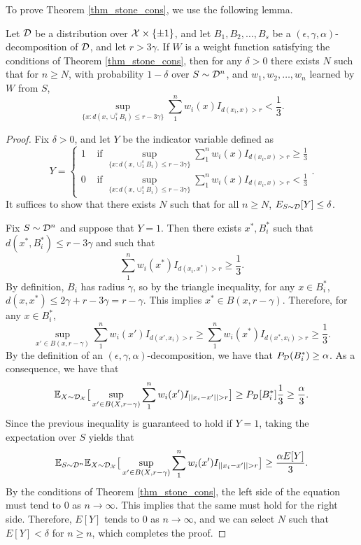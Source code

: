 To prove Theorem \ref{thm_stone_cons}, we use the following lemma. 

\begin{lem}\label{lem_expectation}
Let ${\mathcal D}$ be a distribution over $\mathcal X \times \{\pm 1\}$, and let $B_1, B_2, \dots, B_s$ be a $(\epsilon, \gamma, \alpha)$-decomposition of ${\mathcal D}$, and let $r > 3\gamma$. If $W$ is a weight function satisfying the conditions of Theorem \ref{thm_stone_cons}, then for any $\delta > 0$ there exists $N$ such that for $n \geq N$, with probability $1-\delta$ over $S \sim {\mathcal D}^n$, and $w_1, w_2, \dots, w_n$ learned by $W$ from $S$, $$\sup_{\{x: d(x, \cup_1^s B_i) \leq r - 3\gamma\}} \sum_1^n w_i(x)I_{d(x_i, x) > r} < \frac{1}{3}.$$
\end{lem}

\begin{proof} 
Fix $\delta > 0$, and let $Y$ be the indicator variable defined as $$Y = \begin{cases} 1 & \text{ if }\sup_{\{x: d(x, \cup_1^s B_i) \leq r - 3\gamma\}} \sum_1^n w_i(x)I_{d(x_i, x) > r} \geq \frac{1}{3} \\ 0 & \text{ if }\sup_{\{x: d(x, \cup_1^s B_i) \leq r - 3\gamma\}} \sum_1^n w_i(x)I_{d(x_i, x)> r} < \frac{1}{3} \end{cases}.$$ It suffices to show that there exists $N$ such that for all $n \geq N$, $E_{S \sim {\mathcal D}}[Y] \leq \delta$. 

Fix $S \sim {\mathcal D}^n$ and suppose that $Y = 1$. Then there exists $x^*, B_i^*$ such that $d(x^*, B_i^*) \leq r - 3\gamma$ and such that $$\sum_1^n w_i(x^*)I_{d(x_i, x^*) > r} \geq \frac{1}{3}.$$ By definition, $B_i$ has radius $\gamma$, so by the triangle inequality, for any $x \in B_i^*$, $d(x, x^*) \leq 2\gamma + r - 3\gamma = r - \gamma$. This implies $x^* \in B(x, r-\gamma)$. Therefore, for any $x \in B_i^*$, $$\sup_{x' \in B(x, r-\gamma)} \sum_1^n w_i(x')I_{d(x', x_i) > r} \geq \sum_1^n w_i(x^*)I_{d(x^*, x_i) > r} \geq \frac{1}{3}.$$ By the definition of an $(\epsilon, \gamma, \alpha)$-decomposition, we have that $P_{\mathcal D}(B_i^*) \geq \alpha$. As a consequence, we have that $$\mathbb{E}_{X \sim {\mathcal D}_\mathcal X} \big [ \sup_{x' \in B(X, r-\gamma)} \sum_1^n w_i(x')I_{||x_i - x'|| > r} \big] \geq P_{\mathcal D}[B_i^*]\frac{1}{3} \geq \frac{\alpha}{3}.$$ Since the previous inequality is guaranteed to hold if $Y = 1$, taking the expectation over $S$ yields that $$\mathbb{E}_{S \sim {\mathcal D}^n} \mathbb{E}_{X \sim {\mathcal D}_\mathcal X} \big [ \sup_{x' \in B(X, r-\gamma)} \sum_1^n w_i(x')I_{||x_i - x'|| > r} \big] \geq \frac{\alpha E[Y]}{3}.$$ By the conditions of Theorem \ref{thm_stone_cons}, the left side of the equation must tend to $0$ as $n \to \infty$. This implies that the same must hold for the right side. Therefore, $E[Y]$ tends to $0$ as $n \to \infty$, and we can select $N$ such that $E[Y] < \delta$ for $n \geq n$, which completes the proof. 
\end{proof}

